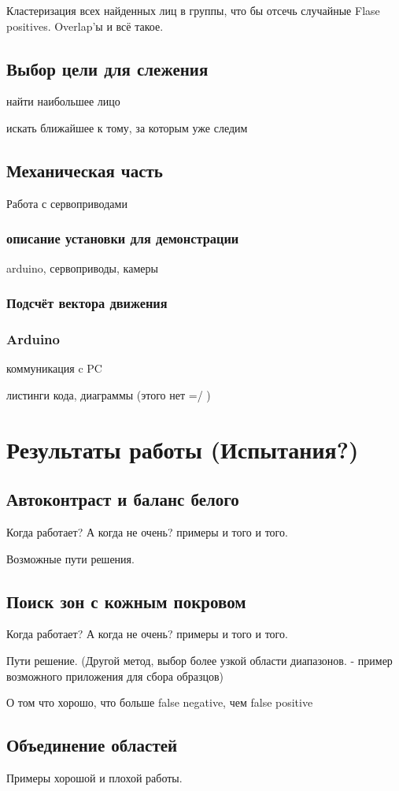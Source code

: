 \documentclass[12pt]{report}
\begin{document}
Кластеризация всех найденных лиц в группы, что бы отсечь случайные Flase positives. Overlap'ы и всё такое.
\section{Выбор цели для слежения}
найти наибольшее лицо

искать ближайшее к тому, за которым уже следим
\section{Механическая часть}
Работа с сервоприводами
\subsection{описание установки для демонстрации}
arduino,
сервоприводы,
камеры
\subsection{Подсчёт вектора движения}
\subsection{Arduino}
коммуникация c PC

листинги кода, диаграммы (этого нет =/ )


\chapter{Результаты работы (Испытания?)}
\thispagestyle{fancy}

\section{Автоконтраст и баланс белого}
Когда работает? А когда не очень? примеры и того и того.

Возможные пути решения.
\section{Поиск зон с кожным покровом}
Когда работает? А когда не очень? примеры и того и того.

Пути решение. (Другой метод, выбор более узкой области диапазонов. - пример возможного приложения для сбора образцов)

О том что хорошо, что больше false negative, чем false positive
\section{Объединение областей}
Примеры хорошой и плохой работы.
\end{document}
